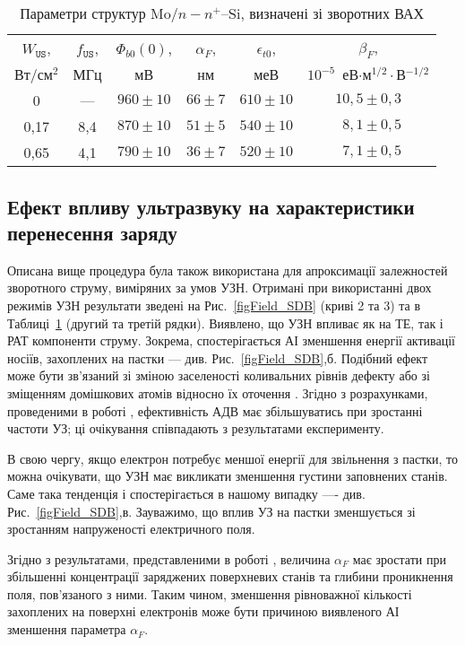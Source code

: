 \begin{table}
\caption{Параметри структур Mo$/n-n^+$--Si, визначені зі зворотних ВАХ}
\label{tabSDBParZv}
\centering
\begin{tabular}{|c|c|c|c|c|c|}
\hline
$W_\mathtt{US}$, &$f_\mathtt{US}$,&$\Phi_{b0}(0)$,&$\alpha_F$,&$\epsilon_{t0}$,&$\beta_F$,\\
Вт/см$^2$&МГц&мВ&нм&меВ&$10^{-5}$~еВ$\cdot$м$^{1/2}\cdot$В$^{-1/2}$\\\hline
0&---&$960\pm10$&$66\pm7$&$610\pm10$&$10,5\pm0,3$\\\hline
0,17&8,4&$870\pm10$&$51\pm5$&$540\pm10$&$\;\:8,1\pm0,5$\\\hline
0,65&4,1&$790\pm10$&$36\pm7$&$520\pm10$&$\;\:7,1\pm0,5$\\\hline
\end{tabular}
\end{table}



\subsection{Ефект впливу ультразвуку на характеристики перенесення заряду}

Описана вище процедура була також використана для апроксимації залежностей зворотного струму, виміряних за умов УЗН.
Отримані при використанні двох режимів УЗН результати зведені на Рис.~\ref{figField_SDB} (криві 2 та 3) та в Таблиці~\ref{tabSDBParZv} (другий та третій рядки).
Виявлено, що УЗН впливає як на ТЕ, так і РАТ компоненти струму.
Зокрема, спостерігається АІ зменшення енергії активації носіїв, захоплених на пастки --- див. Рис.~\ref{figField_SDB},б.
Подібний ефект може бути зв'язаний зі зміною заселеності коливальних рівнів дефекту \cite{Pavlovich} або зі зміщенням домішкових
атомів відносно їх оточення \cite{Korotchenkov1995}.
Згідно з розрахунками, проведеними в роботі \cite{Pavlovich}, ефективність АДВ має збільшуватись при зростанні частоти УЗ;
ці очікування співпадають з результатами експерименту.

В свою чергу, якщо електрон потребує меншої енергії для звільнення з пастки,
то можна очікувати, що УЗН має викликати зменшення густини заповнених станів.
Саме така тенденція і спостерігається в нашому випадку ---- див. Рис.~\ref{figField_SDB},в.
Зауважимо, що вплив УЗ на пастки зменшується зі зростанням напруженості електричного поля.

Згідно з результатами, представленими в роботі \cite{Em:Parker},
величина $\alpha_F$ має зростати при збільшенні концентрації заряджених поверхневих станів та
глибини проникнення поля, пов'язаного  з ними.
Таким чином, зменшення рівноважної кількості захоплених на поверхні електронів може бути причиною виявленого АІ
зменшення параметра $\alpha_F$.

